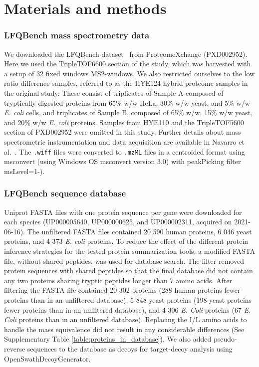 \documentclass[10pt,letterpaper]{article}
\begin{document}
\section*{Materials and methods}

\subsubsection*{LFQBench mass spectrometry data}

We downloaded the LFQBench dataset~\cite{navarro2016multicenter} from ProteomeXchange (PXD002952). Here we used the TripleTOF6600 section of the study, which was harvested with a setup of 32 fixed windows MS2-windows. We also restricted ourselves to the low ratio difference samples, referred to as the HYE124 hybrid proteome samples in the original study. These consist of triplicates of Sample A composed of tryptically digested proteins from 65\% w/w HeLa, 30\% w/w yeast, and 5\% w/w \textit{E. coli} cells, and triplicates of Sample B, composed of 65\% w/w, 15\% w/w yeast, and 20\% w/w \textit{E. coli} proteins. Samples from HYE110 and the TripleTOF5600 section of PXD002952 were omitted in this study. Further details about mass spectrometric instrumentation and data acquisition are available in Navarro et al.~\cite{navarro2016multicenter}. The \verb|.wiff| files were converted to \verb|.mzML| files in a centroided format using msconvert (using Windows OS msconvert version 3.0) with peakPicking filter msLevel=1-). 

\subsubsection*{LFQBench sequence database}

Uniprot FASTA files with one protein sequence per gene were downloaded for each species (UP000005640, UP000000625, and UP000002311, acquired on 2021-06-16). The unfiltered FASTA files contained 20 590 human proteins, 6 046 yeast proteins, and 4 373 \textit{E. coli} proteins. To reduce the effect of the different protein inference strategies for the tested protein summarization tools, a modified FASTA file, without shared peptides, was used for database search. The filter removed protein sequences with shared peptides so that the final database did not contain any two proteins sharing tryptic peptides longer than 7 amino acids. After filtering the FASTA file contained 20 302 proteins (288 human proteins fewer proteins than in an unfiltered database), 5 848 yeast proteins (198 yeast proteins fewer proteins than in an unfiltered database), and 4 306 \textit{E. Coli} proteins (67 \textit{E. Coli} proteins than in an unfiltered database). Replacing the I/L amino acids to handle the mass equivalence did not result in any considerable differences (See Supplementary Table \ref{table:proteins_in_database}). We also added pseudo-reverse sequences to the database as decoys for target-decoy analysis using OpenSwathDecoyGenerator. 
\end{document}
